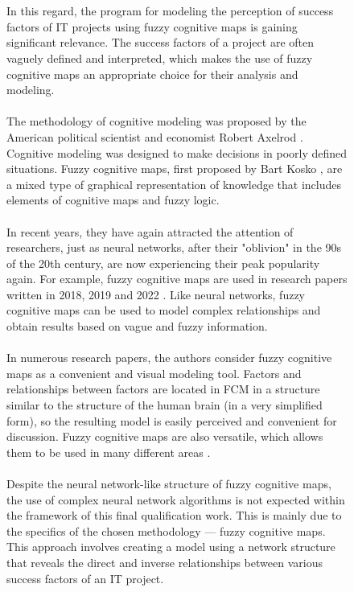 \documentclass{article}
\begin{document}
\begin{figure}[!t]
\begin{minipage}{0.49\textwidth}
            ~\\
            ~\\
        \end{minipage}
        \hfill
        \begin{minipage}{0.49\textwidth}
            In this regard, the program for modeling the perception of success factors of IT projects using fuzzy cognitive maps is gaining significant relevance. The success factors of a project are often vaguely defined and interpreted, which makes the use of fuzzy cognitive maps an appropriate choice for their analysis and modeling.\\
            ~\\
            The methodology of cognitive modeling was proposed by the American political scientist and economist Robert Axelrod \cite{litlink12}. Cognitive modeling was designed to make decisions in poorly defined situations. Fuzzy cognitive maps, first proposed by Bart Kosko \cite{litlink13}, are a mixed type of graphical representation of knowledge that includes elements of cognitive maps and fuzzy logic.\\
            ~\\
            In recent years, they have again attracted the attention of researchers, just as neural networks, after their "{}oblivion"{} in the 90s of the 20th century, are now experiencing their peak popularity again. For example, fuzzy cognitive maps are used in research papers written in 2018, 2019 and 2022 \cite{litlink14, litlink15, litlink16}. Like neural networks, fuzzy cognitive maps can be used to model complex relationships and obtain results based on vague and fuzzy information.\\
            ~\\
            In numerous research papers, the authors consider fuzzy cognitive maps as a convenient and visual modeling tool. Factors and relationships between factors are located in FCM in a structure similar to the structure of the human brain (in a very simplified form), so the resulting model is easily perceived and convenient for discussion. Fuzzy cognitive maps are also versatile, which allows them to be used in many different areas \cite{litlink17}.\\
            ~\\
            Despite the neural network-like structure of fuzzy cognitive maps, the use of complex neural network algorithms is not expected within the framework of this final qualification work. This is mainly due to the specifics of the chosen methodology — fuzzy cognitive maps. This approach involves creating a model using a network structure that reveals the direct and inverse relationships between various success factors of an IT project.\\
            ~\\
            \begin{center}

\end{center}
\end{minipage}
\end{figure}
\end{document}
